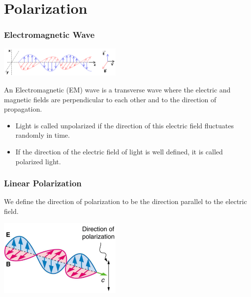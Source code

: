 \documentclass{beamer}
\begin{document}
\section{Polarization}

\begin{frame}\frametitle{Electromagnetic Wave}

\begin{center}
\includegraphics[width=6cm]{fig/em_wave.png}
\end{center}

An Electromagnetic (EM) wave is a transverse wave where the electric and magnetic fields are perpendicular to each other and to the direction of propagation. 

\begin{itemize}
\item Light is called unpolarized if the direction of this electric field fluctuates randomly in time. 
\item If the direction of the electric field of light is well defined, it is called polarized light. 
\end{itemize}

\end{frame}



\begin{frame}\frametitle{Linear Polarization}

We define the direction of polarization to be the direction parallel to the electric field.

\begin{center}
\includegraphics[width=6cm]{fig/polarization1.png}
\end{center}

\end{frame}
\end{document}
